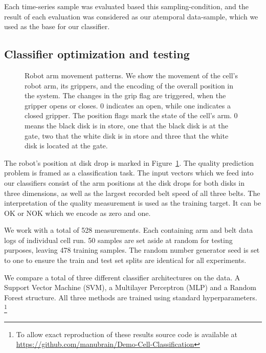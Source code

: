 \documentclass[5p,times,procedia]{elsarticle}
\begin{document}
Each time-series sample was evaluated based this sampling-condition, and the result of each evaluation was considered as our atemporal data-sample, which we used as the base for our classifier.

\subsection{Classifier optimization and testing}\label{sec:ml_exp}

\begin{figure}
       
       \caption{Robot arm movement patterns. We show the movement of the 
                cell's robot arm, its grippers, and the encoding of the overall
                position in the system. The changes in the grip flag are triggered,
                when the gripper opens or closes. 0 indicates an open, while
                one indicates a closed gripper. The position flags mark the state
                of the cell's arm. 0 means the black disk is in store,
                one that the black disk is at the gate, two that the white disk
                is in store and three that the white disk is located at the gate.
             }
\label{fig:robot_pos_cell}
\end{figure}

The robot's position at disk drop is marked in 
Figure~\ref{fig:robot_pos_cell}. The quality prediction problem is 
framed as a classification task. The input vectors which we feed into our
classifiers consist of the arm positions at the disk drops for both
disks in three dimensions, as well as the largest recorded belt speed
of all three belts. The interpretation of the quality measurement is 
used as the training target. It can be OK or NOK which we encode as 
zero and one.

We work with a total of 528 measurements. Each containing arm and belt data
logs of individual cell run. 50 samples are set aside at random for testing 
purposes, leaving 478 training samples. The random number generator seed is
set to one to ensure the train and test set splits are identical 
for all experiments.

We compare a total of three different classifier architectures on the data.
A Support Vector Machine (SVM), a Multilayer Perceptron (MLP) and a Random Forest
structure. All three methods are trained using standard hyperparameters.
\footnote{To allow exact reproduction of these results source
code is available at \url{https://github.com/manubrain/Demo-Cell-Classification}}
\end{document}
